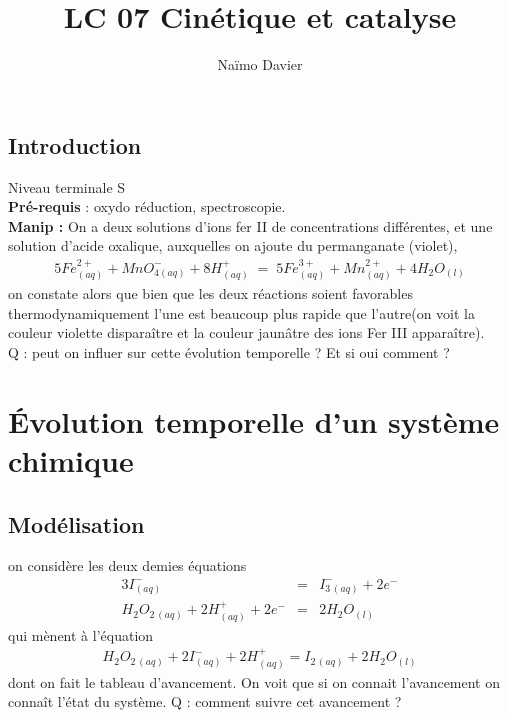 \documentclass[12pt,prb,aps,epsf]{article}
\begin{document}
	
	\title{LC 07 Cinétique et catalyse}
	\author{Naïmo Davier}
	
	\maketitle
	
	\tableofcontents
	
	\pagebreak
	
\subsection{Introduction}
Niveau terminale S\\
	\textbf{Pré-requis} :  oxydo réduction, spectroscopie.\\
	\textbf{Manip :} On a deux solutions d'ions fer II de concentrations différentes, et une solution d'acide oxalique, auxquelles on ajoute du permanganate (violet),
	\begin{eqnarray}
	5Fe^{2+}_{(aq)} + MnO^{-}_{4(aq)} + 8H^+_{(aq)} \;=\; 5Fe^{3+}_{(aq)} + Mn^{2+}_{(aq)} + 4H_2O_{(l)}
	\end{eqnarray}	
	on constate alors que bien que les deux réactions soient favorables thermodynamiquement l'une est beaucoup plus rapide que l'autre(on voit la couleur violette disparaître et la couleur jaunâtre des ions Fer III apparaître).\\
	
	Q : peut on influer sur cette évolution temporelle ? Et si oui comment ?
	
\section{Évolution temporelle d'un système chimique}
\subsection{Modélisation}
on considère les deux demies équations 
\begin{eqnarray}
3I^-_{(aq)} &=& I^-_{3\,(aq)} + 2e^-\\
H_2O_{2\,(aq)}+2H^+_{(aq)} + 2e^- &=& 2H_2O_{(l)}
\end{eqnarray}
qui mènent à l'équation 
\begin{eqnarray}
H_2O_{2\,(aq)} + 2I^-_{(aq)} + 2H^+_{(aq)} = I_{2\,(aq)} + 2H_2O_{(l)}
\end{eqnarray}
dont on fait le tableau d'avancement. 
On voit que si on connait l'avancement on connaît l'état du système. Q : comment suivre cet avancement ?
\end{document}
